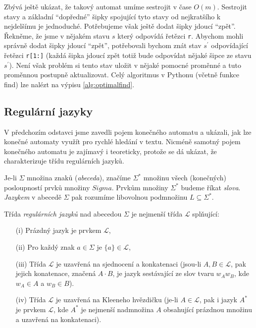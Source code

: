 Zbývá ještě ukázat, že takový automat umíme sestrojit v čase \(O(m)\).  Sestrojit stavy
a základní ``dopředné'' šipky spojující tyto stavy od nejkratšího k nejdelšímu je jednoduché.
Potřebujeme však ještě dodat šipky jdoucí ``zpět''.  Řekněme, že jsme  v nějakém stavu \(s\) 
který odpovídá řetězci {\tt r}. Abychom mohli správně dodat šipky jdoucí ``zpět'', potřebovali
bychom znát stav \(s^\prime\) odpovídající řetězci {\tt r[1:]} (každá šipka jdoucí zpět totiž bude 
odpovídat nějaké šipce ze stavu \(s^\prime\)). Není však problém si tento stav uložit v nějaké
pomocné proměnné a tuto proměnnou postupně aktualizovat.  Celý algoritmus v Pythonu
(včetně funkce find) lze nalézt na výpisu \ref{alg:optimalfind}.


\subsection*{Regulární jazyky}

V předchozím odstavci jsme zavedli pojem konečného automatu a ukázali, jak lze konečné
automaty využít pro rychlé hledání v textu. Nicméně samotný pojem konečného automatu 
je zajímavý i teoreticky, protože se dá ukázat, že charakterizuje třídu regulárních jazyků. 

\begin{definition} Je-li \(\Sigma\) množina znaků (\emph{abeceda}), značíme \(\Sigma^*\) množinu všech
(konečných) posloupností prvků množiny \(Sigma\). Prvkům množiny \(\Sigma^*\) budeme říkat
\emph{slova}.  \emph{Jazykem} v abecedě \(\Sigma\) pak rozumíme libovolnou podmnožinu \(L\subseteq\Sigma^*\).
\end{definition}

\begin{definition}  Třída \emph{regulárních jazyků} nad abecedou \(\Sigma\) je nejmenší třída \(\mathcal L\) splňující:
\begin{itemize}
  \item[(i)] Prázdný jazyk je prvkem \(\mathcal L\),
 \item[(ii)] Pro každý znak \(a\in\Sigma\) je \(\{a\}\in\mathcal L\),
 \item[(iii)] Třída \(\mathcal L\) je uzavřená na sjednocení a konkatenaci (jsou-li \(A,B\in\mathcal L\), pak jejich konatenace,
                     značená \(A\cdot B\), je jazyk sestávající ze slov tvaru \(w_Aw_B\), kde \(w_A\in A\) a \(w_B\in B\)).
 \item[(iv)] Třída \(\mathcal L\) je uzavřená na Kleeneho hvězdičku (je-li \(A\in\mathcal L\), pak i jazyk \(A^*\) je prvkem
                     \(\mathcal L\), kde \(A^*\) je nejmenší nadmnožina \(A\) obsahující prázdnou množinu a uzavřená na konkatenaci).
\end{itemize}
\end{definition}

